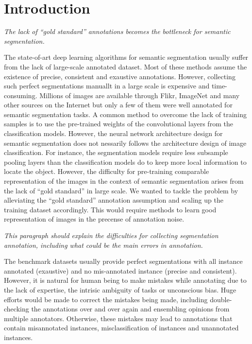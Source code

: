 \section{Introduction}
\label{introduction}

\noindent
\textit{The lack of ``gold standard'' annotations becomes the bottleneck for semantic segmentation.}

\noindent
The state-of-art deep learning algorithms for semantic segmentation \cite{long2015fully} usually suffer from the lack of large-scale annotated dataset.
Most of these methods assume the existence of precise, consistent and exaustive annotations. However, collecting such perfect segmentations manuallt in a large scale is expensive and time-consuming.
Millions of images are available through Flikr, ImageNet and many other sources on the Internet but only a few of them were well annotated for semantic segmentation tasks. \cite{everingham2015pascal,mottaghi2014role,lin2014microsoft}
A common method to overcome the lack of training samples is to use the pre-trained weights of the convolutional layers from the classification models.
However, the neural network architecture design for semantic segmentation does not nessarily follows the architecture design of image classification.
For instance, the segmentation models require less subsample pooling layers than the classification models do to keep more local information to locate the object.
However, the difficulty for pre-training comparable representation of the images in the context of semantic segmentation arises from the lack of ``gold standard'' in large scale.
We wanted to tackle the problem by alleviating the ``gold standard'' annotation assumption and scaling up the training dataset accordingly.
This would require methods to learn good representation of images in the precense of annotation noise.


\noindent
\textit{This paragraph should explain the difficulties for collecting segmentation annotation, including what could be the main errors in annotation.}

\noindent
The benchmark datasets usually provide perfect segmentations with all instance annotated (exaustive) and no mis-annotated instance (precise and consistent).
However, it is natural for human being to make mistakes while annotating due to the lack of expertise, the intrisic ambiguity of tasks or unconscious bias.
Huge efforts would be made to correct the mistakes being made, including double-checking the annotations over and over again and ensembling opinions from multiple annotators.
Otherwise, these mistakes may lead to annotations that contain misannotated instances, misclassification of instances and unannotated instances.



